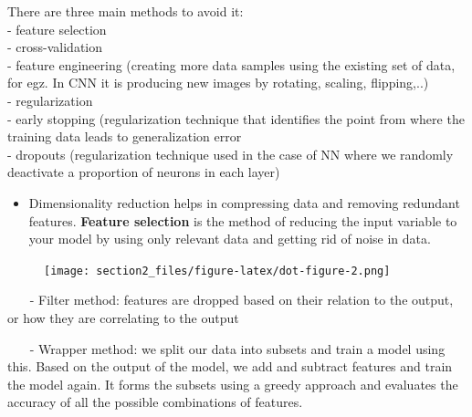 \documentclass[
  letterpaper,
]{book}
\providecommand{\tightlist}{%
  \setlength{\itemsep}{0pt}\setlength{\parskip}{0pt}}\usepackage{longtable,booktabs,array}
\begin{document}
There are three main methods to avoid it:\\
\hspace*{0.333em}\hspace*{0.333em}- feature selection\\
\hspace*{0.333em}\hspace*{0.333em}- cross-validation\\
\hspace*{0.333em}\hspace*{0.333em}- feature engineering (creating more
data samples using the existing set of data, for egz. In CNN it is
producing new images by rotating, scaling, flipping,..)\\
\hspace*{0.333em}\hspace*{0.333em}- regularization\\
\hspace*{0.333em}\hspace*{0.333em}- early stopping (regularization
technique that identifies the point from where the training data leads
to generalization error\\
\hspace*{0.333em}\hspace*{0.333em}- dropouts (regularization technique
used in the case of NN where we randomly deactivate a proportion of
neurons in each layer)

\begin{itemize}
\tightlist
\item
  Dimensionality reduction helps in compressing data and removing
  redundant features. \textbf{Feature selection} is the method of
  reducing the input variable to your model by using only relevant data
  and getting rid of noise in data.
\end{itemize}

\hypertarget{feature-selection}{}
\begin{figure}[H]

{\centering \texttt{[image: section2\_files/figure-latex/dot-figure-2.png]}

}

\end{figure}

\hfill\break
\(~~~~~~~~\)- Filter method: features are dropped based on their
relation to the output, or how they are correlating to the output

\(~~~~~~~~\)- Wrapper method: we split our data into subsets and train a
model using this. Based on the output of the model, we add and subtract
features and train the model again. It forms the subsets using a greedy
approach and evaluates the accuracy of all the possible combinations of
features.
\end{document}

